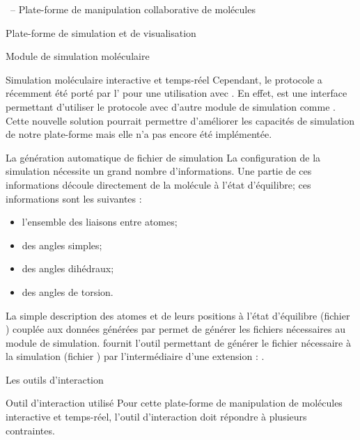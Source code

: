 \documentclass[myfrancais,ngerman,english,frenchb]{mythesis}
\begin{document}
\begin{mychapter}{\myShaddock\ -- Plate-forme de manipulation collaborative de molécules}
\begin{mysection}{Plate-forme de simulation et de visualisation}
\begin{mysubsection}{Module de simulation moléculaire}
\begin{mysubsubsection}{Simulation moléculaire interactive et temps-réel}
					Cependant, le protocole  a récemment été porté par l' pour une utilisation avec \myGromacs.
					En effet, \myMDDriver {} est une interface permettant d'utiliser le protocole  avec d'autre module de simulation comme \myGromacs.
					Cette nouvelle solution pourrait permettre d'améliorer les capacités de simulation de notre plate-forme mais elle n'a pas encore été implémentée.
				\end{mysubsubsection}
				\begin{mysubsubsection}{La génération automatique de fichier de simulation}
					La configuration de la simulation nécessite un grand nombre d'informations.
					Une partie de ces informations découle directement de la molécule à l'état d'équilibre; ces informations sont les suivantes :
					\begin{itemize}
						\item l'ensemble des liaisons entre atomes;
						\item des angles simples;
						\item des angles dihédraux;
						\item des angles de torsion.
					\end{itemize}
					La simple description des atomes et de leurs positions à l'état d'équilibre (fichier \myPDB) couplée aux données générées par \myCHARMM {} permet de générer les fichiers nécessaires au module de simulation.
					 fournit l'outil permettant de générer le fichier nécessaire à la simulation (fichier \myPSF) par l'intermédiaire d'une extension : .
				\end{mysubsubsection}
			\end{mysubsection}
		\end{mysection}
		\begin{mysection}{Les outils d'interaction}
			\begin{mysubsection}{Outil d'interaction utilisé}
				Pour cette plate-forme de manipulation de molécules interactive et temps-réel, l'outil d'interaction doit répondre à plusieurs contraintes.


\end{mysubsection}
\end{mysection}
\end{mychapter}
\end{document}

